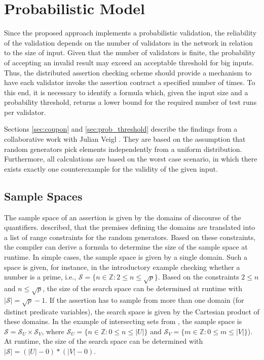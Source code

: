 \chapter{Probabilistic Model}\label{chap:prob_model}
Since the proposed approach implements a probabilistic validation, the reliability of the validation depends on the number of validators in the network in relation to the size of input. Given that the number of validators is finite, the probability of accepting an invalid result may exceed an acceptable threshold for big inputs. Thus, the distributed assertion checking scheme should provide a mechanism to have each validator invoke the assertion contract a specified number of times. To this end, it is necessary to identify a formula which, given the input size and a probability threshold, returns a lower bound for the required number of test runs per validator. 

Sections \ref{sec:coupon} and \ref{sec:prob_threshold} describe the findings from a collaborative work with Julian Veigl \cite{bernhardt_veigel_2020}. They are based on the assumption that random generators pick elements independently from a uniform distribution. Furthermore, all calculations are based on the worst case scenario, in which there exists exactly one counterexample for the validity of the given input.

\section{Sample Spaces}\label{sec:sample_space}
The sample space of an assertion is given by the domains of discourse of the quantifiers.  described, that the premises defining the domains are translated into a list of range constraints for the random generators. Based on these constraints, the compiler can derive a formula to determine the size of the sample space at runtime. In simple cases, the sample space is given by a single domain. Such a space is given, for instance, in the introductory example checking whether a number is a prime, i.e., $\mathcal{S} = \lbrace n \in\mathbb{Z} : 2 \le n \le \sqrt{p} \rbrace$. Based on the constraints $2 \le n$ and $n \le \sqrt{p}$, the size of the search space can be determined at runtime with $|\mathcal{S}| = \sqrt{p} - 1$. If the assertion has to sample from more than one domain (for distinct predicate variables), the search space is given by the Cartesian product of these domains. In the example of intersecting sets from , the sample space is $\mathcal{S} = \mathcal{S}_U \times \mathcal{S}_V$, where $\mathcal{S}_U = \lbrace n \in\mathbb{Z} : 0 \leq n \le |U| \rbrace$ and $\mathcal{S}_V = \lbrace m \in\mathbb{Z} : 0 \leq m \le |V| \rbrace$). At runtime, the size of the search space can be determined with $|\mathcal{S}| = (|U| - 0) * (|V| - 0)$.

